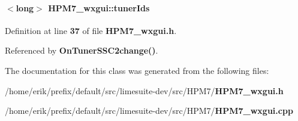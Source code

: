 \paragraph[{tuner\+Ids}]{$<$long$>$ H\+P\+M7\+\_\+wxgui\+::tuner\+Ids\hspace{0.3cm}{\ttfamily [protected]}}\label{classHPM7__wxgui_ae3484ef16a50c01527aed908b1ed8864}


Definition at line {\bf 37} of file {\bf H\+P\+M7\+\_\+wxgui.\+h}.



Referenced by {\bf On\+Tuner\+S\+S\+C2change()}.



The documentation for this class was generated from the following files\+:\begin{DoxyCompactItemize}
\item 
/home/erik/prefix/default/src/limesuite-\/dev/src/\+H\+P\+M7/{\bf H\+P\+M7\+\_\+wxgui.\+h}\item 
/home/erik/prefix/default/src/limesuite-\/dev/src/\+H\+P\+M7/{\bf H\+P\+M7\+\_\+wxgui.\+cpp}\end{DoxyCompactItemize}
